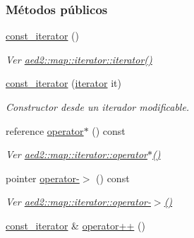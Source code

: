 \subsubsection*{\-Métodos públicos}
\begin{DoxyCompactItemize}
\item 
\hyperlink{classaed2_1_1iterator_1_1const__iterator_aaa51a026552b907959961fb5e890f786_aaa51a026552b907959961fb5e890f786}{const\-\_\-iterator} ()
\begin{DoxyCompactList}\small\item\em \-Ver \hyperlink{classaed2_1_1map_1_1iterator_acdd790eb54216601a2e0591776004dba_acdd790eb54216601a2e0591776004dba}{aed2\-::map\-::iterator\-::iterator()} \end{DoxyCompactList}\item 
\hyperlink{classaed2_1_1iterator_1_1const__iterator_a721711310bb4fc525e4ce9a2b13f7ce9_a721711310bb4fc525e4ce9a2b13f7ce9}{const\-\_\-iterator} (\hyperlink{classaed2_1_1iterator_1_1iterator}{iterator} it)
\begin{DoxyCompactList}\small\item\em \-Constructor desde un iterador modificable. \end{DoxyCompactList}\item 
reference \hyperlink{classaed2_1_1iterator_1_1const__iterator_ab3071f59219b331e17a68c89cc4cca15_ab3071f59219b331e17a68c89cc4cca15}{operator$\ast$} () const 
\begin{DoxyCompactList}\small\item\em \-Ver \hyperlink{classaed2_1_1map_1_1iterator_a48e75896997d516fe69bc18f889222fe_a48e75896997d516fe69bc18f889222fe}{aed2\-::map\-::iterator\-::operator$\ast$()} \end{DoxyCompactList}\item 
pointer \hyperlink{classaed2_1_1iterator_1_1const__iterator_a3744a7cb5e8a35ff13663ece424b70f1_a3744a7cb5e8a35ff13663ece424b70f1}{operator-\/$>$} () const 
\begin{DoxyCompactList}\small\item\em \-Ver \hyperlink{classaed2_1_1map_1_1iterator_a227de3b56a6ff2e6bb6de2d08277ca60_a227de3b56a6ff2e6bb6de2d08277ca60}{aed2\-::map\-::iterator\-::operator-\/$>$()} \end{DoxyCompactList}\item 
\hyperlink{classaed2_1_1iterator_1_1const__iterator}{const\-\_\-iterator} \& \hyperlink{classaed2_1_1iterator_1_1const__iterator_acf3320ad50b0c151117e2384ec784330_acf3320ad50b0c151117e2384ec784330}{operator++} ()

\end{DoxyCompactItemize}
